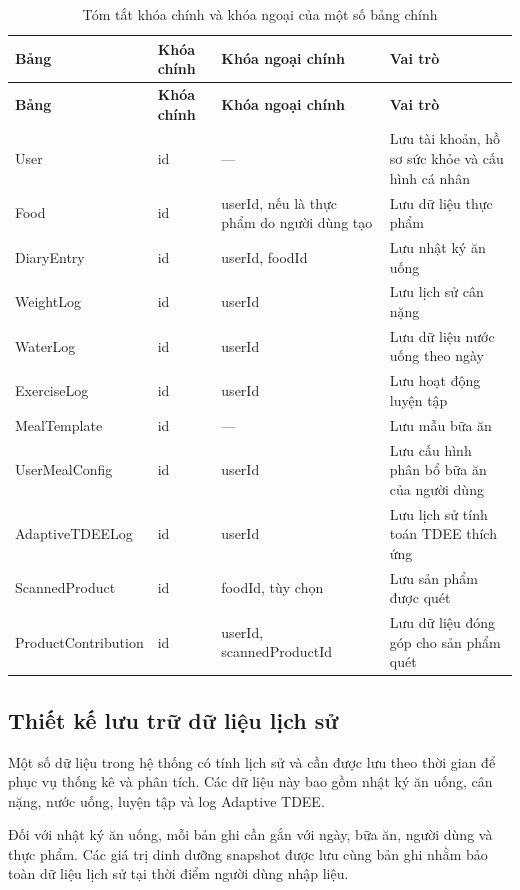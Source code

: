 \documentclass[12pt, a4paper]{report}
\begin{document}
\begin{longtable}{|>{\raggedright\arraybackslash}p{3.5cm}|>{\raggedright\arraybackslash}p{2cm}|>{\raggedright\arraybackslash}p{4.5cm}|>{\raggedright\arraybackslash}p{5cm}|}
\caption{Tóm tắt khóa chính và khóa ngoại của một số bảng chính}
\label{tab:tom_tat_khoa} \\
\hline
\textbf{Bảng} & \textbf{Khóa chính} & \textbf{Khóa ngoại chính} & \textbf{Vai trò} \\
\hline
\endfirsthead
\hline
\textbf{Bảng} & \textbf{Khóa chính} & \textbf{Khóa ngoại chính} & \textbf{Vai trò} \\
\hline
\endhead

User & id & --- & Lưu tài khoản, hồ sơ sức khỏe và cấu hình cá nhân \\
\hline
Food & id & userId, nếu là thực phẩm do người dùng tạo & Lưu dữ liệu thực phẩm \\
\hline
DiaryEntry & id & userId, foodId & Lưu nhật ký ăn uống \\
\hline
WeightLog & id & userId & Lưu lịch sử cân nặng \\
\hline
WaterLog & id & userId & Lưu dữ liệu nước uống theo ngày \\
\hline
ExerciseLog & id & userId & Lưu hoạt động luyện tập \\
\hline
MealTemplate & id & --- & Lưu mẫu bữa ăn \\
\hline
UserMealConfig & id & userId & Lưu cấu hình phân bổ bữa ăn của người dùng \\
\hline
AdaptiveTDEELog & id & userId & Lưu lịch sử tính toán TDEE thích ứng \\
\hline
ScannedProduct & id & foodId, tùy chọn & Lưu sản phẩm được quét \\
\hline
ProductContribution & id & userId, scannedProductId & Lưu dữ liệu đóng góp cho sản phẩm quét \\
\hline
\end{longtable}

\subsection{Thiết kế lưu trữ dữ liệu lịch sử}Một số dữ liệu trong hệ thống có tính lịch sử và cần được lưu theo thời gian để phục vụ thống kê và phân tích. Các dữ liệu này bao gồm nhật ký ăn uống, cân nặng, nước uống, luyện tập và log Adaptive TDEE.

Đối với nhật ký ăn uống, mỗi bản ghi cần gắn với ngày, bữa ăn, người dùng và thực phẩm. Các giá trị dinh dưỡng snapshot được lưu cùng bản ghi nhằm bảo toàn dữ liệu lịch sử tại thời điểm người dùng nhập liệu.
\end{document}
